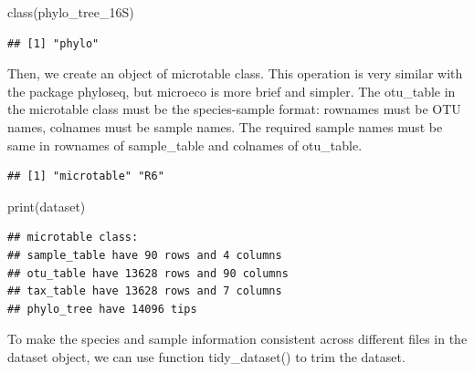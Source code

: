 \documentclass[
]{book}
\newenvironment{Shaded}{\begin{snugshade}}{\end{snugshade}}
\newcommand{\AttributeTok}[1]{\textcolor[rgb]{0.77,0.63,0.00}{#1}}
\newcommand{\CommentTok}[1]{\textcolor[rgb]{0.56,0.35,0.01}{\textit{#1}}}
\newcommand{\FunctionTok}[1]{\textcolor[rgb]{0.00,0.00,0.00}{#1}}
\newcommand{\NormalTok}[1]{#1}
\newcommand{\OtherTok}[1]{\textcolor[rgb]{0.56,0.35,0.01}{#1}}
\newcommand{\SpecialCharTok}[1]{\textcolor[rgb]{0.00,0.00,0.00}{#1}}
\begin{document}
\begin{Shaded}
\begin{Highlighting}[]
\FunctionTok{class}\NormalTok{(phylo\_tree\_16S)}
\end{Highlighting}
\end{Shaded}

\begin{verbatim}
## [1] "phylo"
\end{verbatim}

Then, we create an object of microtable class.
This operation is very similar with the package phyloseq\citep{Mcmurdie_phyloseq_2013}, but microeco is more brief and simpler.
The otu\_table in the microtable class must be the species-sample format: rownames must be OTU names, colnames must be sample names.
The required sample names must be same in rownames of sample\_table and colnames of otu\_table.

\begin{Shaded}
\end{Shaded}

\begin{verbatim}
## [1] "microtable" "R6"
\end{verbatim}

\begin{Shaded}
\begin{Highlighting}[]
\FunctionTok{print}\NormalTok{(dataset)}
\end{Highlighting}
\end{Shaded}

\begin{verbatim}
## microtable class:
## sample_table have 90 rows and 4 columns
## otu_table have 13628 rows and 90 columns
## tax_table have 13628 rows and 7 columns
## phylo_tree have 14096 tips
\end{verbatim}

To make the species and sample information consistent across different files in the dataset object, we can use function tidy\_dataset() to trim the dataset.
\end{document}
